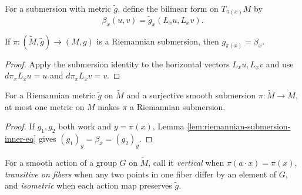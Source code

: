 \begin{definition}
\label{def:submersion-inner}





For a submersion with metric $\tilde g$, define the bilinear form on $T_{\pi(x)}M$ by
\[
\beta_x(u,v)=\tilde g_x(L_xu,L_xv).
\]
\end{definition}

\begin{lemma}
\label{lem:riemannian-submersion-inner-eq}





If $\pi:(\tilde M,\tilde g)\to(M,g)$ is a Riemannian submersion, then $g_{\pi(x)}=\beta_x$.
\end{lemma}

\begin{proof}

\sketch Apply the submersion identity to the horizontal vectors $L_xu,L_xv$ and use $d\pi_xL_xu=u$ and $d\pi_xL_xv=v$.
\end{proof}

\begin{proposition}
\label{prop:riemannian-submersion-metric-unique}





For a Riemannian metric $\tilde g$ on $\tilde M$ and a surjective smooth submersion $\pi:\tilde M\to M$, at most one metric on $M$ makes $\pi$ a Riemannian submersion.
\end{proposition}

\begin{proof}

\sketch If $g_1,g_2$ both work and $y=\pi(x)$, Lemma \ref{lem:riemannian-submersion-inner-eq} gives $(g_1)_y=\beta_x=(g_2)_y$.
\end{proof}

For a smooth action of a group $G$ on $\tilde M$, call it \emph{vertical} when $\pi(a\cdot x)=\pi(x)$, \emph{transitive on fibers} when any two points in one fiber differ by an element of $G$, and \emph{isometric} when each action map preserves $\tilde g$.

